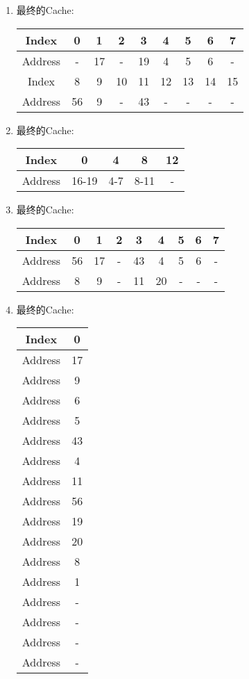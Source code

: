 \documentclass[a4paper,11pt]{article}
\begin{document}
\begin{enumerate}
	\item 最终的Cache:
	\begin{center}
		\begin{tabular}{c|c|c|c|c|c|c|c|c} \hline
			Index & 0 & 1 & 2 & 3 & 4 & 5 & 6 & 7 \\ \hline
			Address & - & 17 & - & 19 & 4 & 5 & 6 & - \\ \hline
			Index & 8 & 9 & 10 & 11 & 12 & 13 & 14 & 15 \\ \hline
			Address & 56 & 9 & - & 43 & - & - & - & - \\ \hline  
		\end{tabular}
	\end{center}
	\item 最终的Cache:
	\begin{center}
		\begin{tabular}{c|c|c|c|c} \hline
			Index & 0 & 4 & 8 & 12 \\ \hline
			Address & 16-19 & 4-7 & 8-11 & - \\ \hline 
		\end{tabular}
	\end{center}
	\item 最终的Cache:
	\begin{center}
		\begin{tabular}{c|c|c|c|c|c|c|c|c} \hline
			Index & 0 & 1 & 2 & 3 & 4 & 5 & 6 & 7 \\ \hline
			Address & 56 & 17 & - & 43 & 4 & 5 & 6 & - \\ \hline
			Address & 8 & 9 & - & 11 & 20 & - & - & - \\ \hline  
		\end{tabular}
	\end{center}
	\item 最终的Cache:
	\begin{center}
		\begin{tabular}{c|c} \hline
			Index & 0 \\ \hline
			Address & 17 \\ \hline
			Address & 9 \\ \hline
			Address & 6 \\ \hline 
			Address & 5 \\ \hline 
			Address & 43 \\ \hline 
			Address & 4 \\ \hline 
			Address & 11 \\ \hline 
			Address & 56 \\ \hline 
			Address & 19 \\ \hline 
			Address & 20 \\ \hline 
			Address & 8 \\ \hline 
			Address & 1 \\ \hline 
			Address & - \\ \hline
			Address & - \\ \hline
			Address & - \\ \hline
			Address & - \\ \hline
		\end{tabular}
	\end{center}
\end{enumerate}
\end{document}
